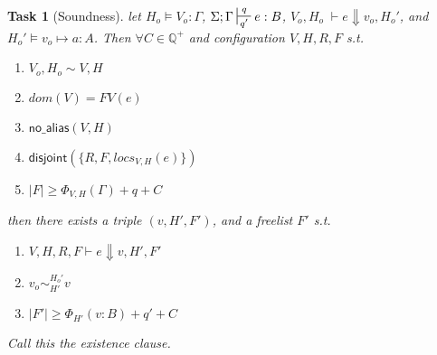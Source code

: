 \documentclass[11pt]{article}
\newcounter{group}
\newtheorem{theorem}{Task}[group]
\newcommand{\na}[1]{\mathsf{no\_alias}(#1)}
\newcommand{\dist}[1]{\mathsf{disjoint}(#1)}
\newcommand{\veq}[4]{#3 \sim^{#1}_{#2} #4}
\theoremstyle{definition}
\begin{document}
\begin{theorem}[Soundness]
\label{b} let $H_o \vDash V_o : \Gamma$, $\Sigma; \Gamma \sststile{q'}{q} e : B$,
$V_o,H_o \; \vdash e \Downarrow v_o, H_o'$, and $H_o' \vDash v_o \mapsto a : A$.
Then $\forall C \in \mathbb{Q}^{+}$ and configuration $V,H,R,F$ s.t.
\begin{enumerate} 
\item $V_o,H_o \sim V,H$
\item $dom(V) = FV(e)$
\item $\na{V,H}$
\item $\dist{\{R,F,locs_{V,H}(e)\}}$
\item $|F| \ge \Phi_{V,H}(\Gamma) + q + C$ 
\end{enumerate}
then there exists a triple $(v,H',F')$, and a freelist $F'$ s.t.
\begin{enumerate}
  \item $V,H,R,F \vdash e \Downarrow v, H', F'$
	\item $\veq{H_o'}{H'}{v_o}{v}$
  \item $|F'| \ge \Phi_{H'}(v:B) + q' + C$
\end{enumerate}
Call this the existence clause.
\end{theorem}
\end{document}
